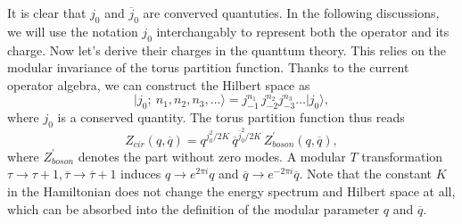 \documentclass[submission, PhysLectNotes]{SciPost}
\begin{document}
It is clear that $j_0$ and $\overline{j}_0$ are converved quantuties. In the following discussions, we will use the notation $j_0$ interchangably to represent both the operator and its charge. Now let's derive their charges in the quanttum theory. This relies on the modular invariance of the torus partition function. Thanks to the current operator algebra, we can construct the Hilbert space as
\begin{equation}
	\vert j_0;\ n_1, n_2,n_3,\dots \rangle = j_{-1}^{n_1}\,j_{-2}^{n_2} j_{-3}^{n_3} \dots \vert j_0\rangle, 
\end{equation}
where $j_0$ is a conserved quantity. The torus partition function thus reads
\begin{equation}
	Z_{cir}(q,\overline{q}) = q^{j_0^2/2K} \, \overline{q}^{\overline{j}_0^2/2K} \, Z^{\prime}_{boson} (q,\overline{q}),
\end{equation}
where $Z^\prime_{boson}$ denotes the part without zero modes. A modular $T$ transformation $\tau \rightarrow \tau + 1, \overline{\tau} \rightarrow \overline{\tau} + 1$ induces $q \rightarrow e^{2\pi i}q$ and $\overline{q} \rightarrow e^{-2\pi i}\overline{q}$. Note that the constant $K$ in the Hamiltonian does not change the energy spectrum and Hilbert space at all, which can be absorbed into the definition of the modular parameter $q$ and $\overline{q}$. 
\end{document}

